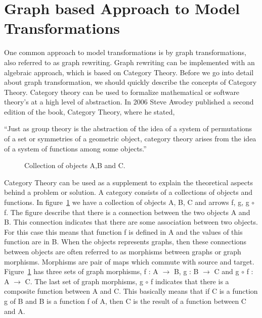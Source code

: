 \section{Graph based Approach to Model Transformations} 
\label{sec:graph_based}

One common approach to model transformations is by graph transformations,
also referred to as graph rewriting. Graph rewriting can be implemented with
an algebraic approach, which is based on Category Theory. Before we go into
detail about graph transformation, we should quickly describe the concepts of
Category Theory\cite{Herrlich1973,Barr1990}. Category theory can be used to
formalize mathematical or software theory's at a high level of abstraction. In
2006 Steve Awodey published a second edition of the book, Category Theory,
where he stated,

``Just as group theory is the abstraction of the idea of a system of
permutations of a set or symmetries of a geometric object, category theory
arises from the idea of a system of functions among some
objects\cite{Awodey2006}.''

\begin{figure}[H]
	\centering
	\caption[Category Theory]
	{Collection of objects A,B and C.}
	\label{fig:categoryTheory}
\end{figure}




Category Theory can be used as a supplement to explain the theoretical aspects
behind a problem or solution. A category consists of a collections of
objects and functions. In figure~\ref{fig:categoryTheory} we have a collection
of objects A, B, C and arrows f, g, g $\circ$ f. The figure describe that
there is a connection between the two objects A and B. This connection
indicates that there are some association between two objects. For this case
this means that function f is defined in A and the values of this function are
in B. When the objects represents graphs, then these connections between objects
are often referred to as morphisms between graphs or graph morphisms. Morphisms
are pair of maps which commute with source and target\cite{Brown2008}.
Figure~\ref{fig:categoryTheory} has three sets of graph morphisms, f : A
$\longrightarrow$ B, g : B $\longrightarrow$ C and g $\circ$ f : A
$\longrightarrow$ C. The last set of graph morphisms, g $\circ$ f indicates that
there is a composite function between A and C. This basically means that if
C is a function g of B and B is a function f of A, then C is the result of a
function between C and A. 


